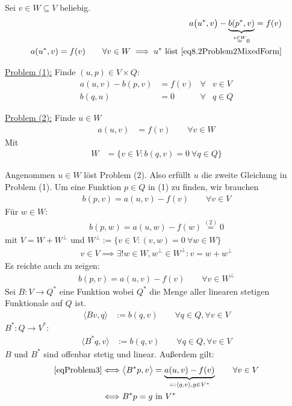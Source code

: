 Sei $v\in W\subseteq V$ beliebig.
\begin{align*}
	a\big(u^\ast,v\big)-\underbrace{b(p^\ast,v)}_{\overset{v\in W}{=}0}=f(v)\\
	a(u^\ast,v)=f(v)\qquad\forall v\in W
	\implies u^\ast\text{ löst }\eqref{eq8.2Problem2MixedForm}
\end{align*}

\underline{Problem (1):}
Finde $(u,p)\in V\times Q:$
\begin{align*}
	a(u,v)-b(p,v)&=f(v) &\forall&v\in V\\
	b(q,u)&=0 &\forall& q\in Q
\end{align*}

\underline{Problem (2):}
Finde $u\in W$
\begin{align*}
	a(u,v)&=f(v) \qquad\forall v\in W
\end{align*}
Mit
\begin{align*}
	W&=\big\lbrace v\in V:b(q,v)=0~\forall q\in Q\big\rbrace
\end{align*}

Angenommen $u\in W$ löst Problem (2).
Also erfüllt $u$ die zweite Gleichung in Problem (1).
Um eine Funktion $p\in Q$ in (1) zu finden, wir brauchen
\begin{align*}
	b(p,v)=a(u,v)-f(v)\qquad\forall v\in V
\end{align*}
Für $w\in W:$
\begin{align*}
	b(p,w)=a(u,w)-f(w)\overset{(2)}{=}0
\end{align*}
mit $V=W+W^\perp$ und $W^\perp:=\big\lbrace v\in V:(v,w)=0~\forall w\in W\big\rbrace$
\begin{align*}
v\in V\implies\exists! w\in W,w^\perp\in W^\perp:v=w+w^\perp
\end{align*}
Es reichte auch zu zeigen:
\begin{align}\label{eqProblem3}\tag{3}
	b(p,v)=a(u,v)-f(v)\qquad\forall v\in W^\perp
\end{align}
Sei $B:V\to Q^\ast$ eine Funktion wobei $Q^\ast$ die Menge aller linearen stetigen Funktionale auf $Q$ ist.
\begin{align*}
	\langle Bv,q\rangle&:=b(q,v)\qquad\forall q\in Q,\forall v\in V
\end{align*}
$B^\ast:Q\to V^\ast$:
\begin{align*}
	\langle B^\ast q,v\rangle&:=b(q,v)\qquad\forall q\in Q,\forall v\in V
\end{align*}
$B$ und $B^\ast$ sind offenbar stetig und linear.
Außerdem gilt:
\begin{align*}
	\eqref{eqProblem3}&\Longleftrightarrow\big\langle B^\ast p,v\big\rangle
	=\underbrace{a(u,v)-f(v)}_{=:\langle g,v\rangle,g\in V^\ast}\qquad\forall v\in V\\
	&\Longleftrightarrow B^\ast p=g\text{ in }V^\ast
\end{align*}

